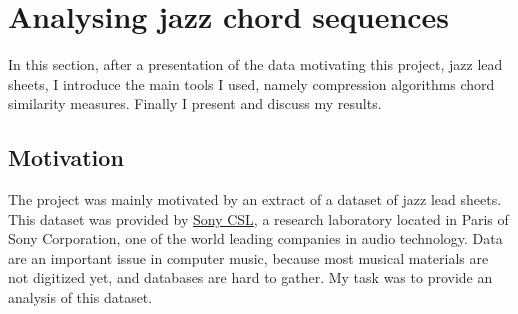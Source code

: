 \documentclass[a4paper,10pt]{article}
\begin{document}
%


\newpage
\section{Analysing jazz chord sequences}

In this section, after a presentation of the data motivating this project, jazz lead sheets, I introduce the main tools I used, namely compression algorithms chord similarity measures. Finally I present and discuss my results.

\subsection{Motivation}
\label{motivation}

The project was mainly motivated by an extract of a dataset of jazz lead sheets. This dataset was provided by \href{http://www.csl.sony.fr/music.php}{Sony CSL}, a research laboratory located in Paris of Sony Corporation, one of the world leading companies in audio technology. Data are an important issue in computer music, because most musical materials are not digitized yet, and databases are hard to gather. My task was to provide an analysis of this dataset.
\end{document}
